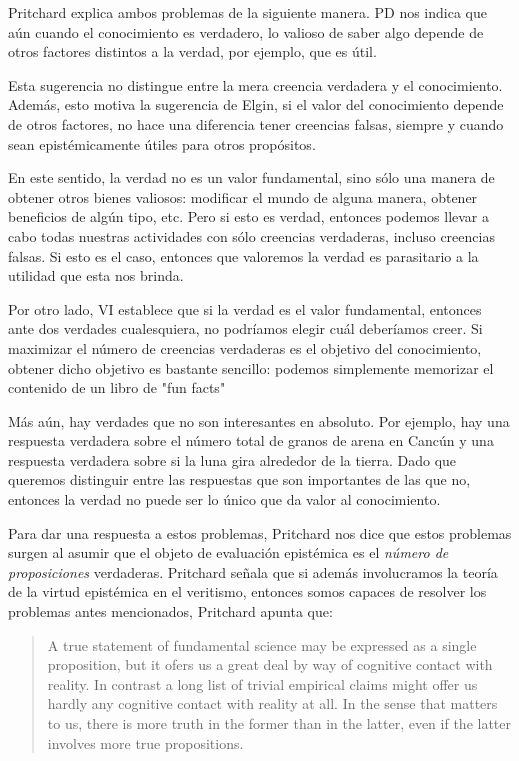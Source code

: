 Pritchard explica ambos problemas de la siguiente manera.
PD nos indica que aún cuando el conocimiento es verdadero, lo valioso de saber algo depende de otros factores distintos a la verdad, por ejemplo, que es útil.

Esta sugerencia no distingue entre la mera creencia verdadera y el conocimiento.
Además, esto motiva la sugerencia de Elgin, si el valor del conocimiento depende de otros factores, no hace una diferencia tener creencias falsas, siempre y cuando sean epistémicamente útiles para otros propósitos.

En este sentido, la verdad no es un valor fundamental, sino sólo una manera de obtener otros bienes valiosos: modificar el mundo de alguna manera, obtener beneficios de algún tipo, etc.
Pero si esto es verdad, entonces podemos llevar a cabo todas nuestras actividades con sólo creencias verdaderas, incluso creencias falsas. Si esto es el caso, entonces que valoremos la verdad es parasitario a la utilidad que esta nos brinda.

Por otro lado, VI establece que si la verdad es el valor fundamental, entonces ante dos verdades cualesquiera, no podríamos elegir cuál deberíamos creer.
Si maximizar el número de creencias verdaderas es el objetivo del conocimiento, obtener dicho objetivo es bastante sencillo: podemos simplemente memorizar el contenido de un libro de "fun facts"

Más aún, hay verdades que no son interesantes en absoluto.
Por ejemplo, hay una respuesta verdadera sobre el número total de granos de arena en Cancún y una respuesta verdadera sobre si la luna gira alrededor de la tierra.
Dado que queremos distinguir entre las respuestas que son importantes de las que no, entonces la verdad no puede ser lo único que da valor al conocimiento.

Para dar una respuesta a estos problemas, Pritchard \parencite{pritchard2021, pritchard2021a} nos dice que estos problemas surgen al asumir que el objeto de evaluación epistémica es el \emph{número de proposiciones} verdaderas.
Pritchard señala que si además involucramos la teoría de la virtud epistémica en el veritismo, entonces somos capaces de resolver los problemas antes mencionados, Pritchard apunta que:

\begin{quote}
  A true statement of fundamental science may be expressed as a single proposition, but it ofers us a great deal by way of cognitive contact with reality. In contrast a long list of trivial empirical claims might offer us hardly any cognitive contact with reality at all. In the sense that matters to us, there is more truth in the former than in the latter, even if the latter involves more true propositions. \parencite[][pp. 1353-1354]{pritchard2021}
\end{quote}


